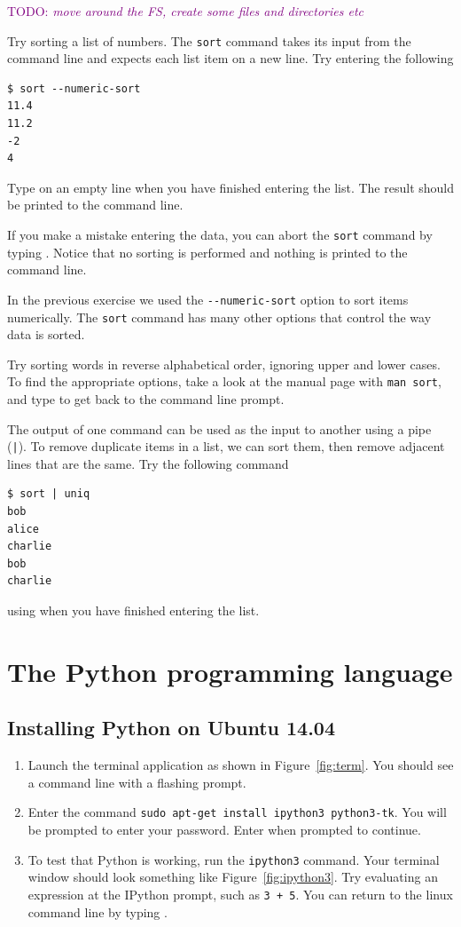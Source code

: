 \documentclass[a4paper,twoside]{memoir}
\makeatletter
\newcommand{\FrameTitle}[2]{%
  \fboxrule=\FrameRule \fboxsep=\FrameSep
  \fbox{\vbox{\nobreak \vskip -0.7\FrameSep
    \rlap{\centerline{\strut#1}}\nobreak\nointerlineskip%
    \vskip 0.7\FrameSep
    \hbox{#2}}}}
\newenvironment{framewithtitle}[2][\FrameFirst@Lab\ (cont.)]{%
  \def\FrameFirst@Lab{\textbf{#2}}%
  \def\FrameCont@Lab{\textbf{#1}}%
  \def\FrameCommand##1{%
    \FrameTitle{\FrameFirst@Lab}{##1}}%
  \def\FirstFrameCommand##1{%
    \FrameTitle{\FrameFirst@Lab}{##1}}%
  \def\MidFrameCommand##1{%
    \FrameTitle{\FrameCont@Lab}{##1}}%
  \def\LastFrameCommand##1{%
    \FrameTitle{\FrameCont@Lab}{##1}}%
\MakeFramed{\advance\hsize-\width \FrameRestore}}%
{\endMakeFramed}
\newcounter{exercisectr}
\newenvironment{exercise}
{\stepcounter{exercisectr}\begin{framewithtitle}{Practical \arabic{exercisectr}}}
{\end{framewithtitle}}
\newcommand{\shellcmd}{\texttt}
\newcommand{\additional}{\medskip\noindent{\textit{Additional exercises}}}
\newcommand{\TODO}[1]{\textcolor{purple}{TODO: \emph{#1}}}
\makeatother
\begin{document}
\begin{exercise}
\TODO{move around the FS, create some files and directories etc}

Try sorting a list of numbers.  The \shellcmd{sort} command takes its input from the command line and expects each list item on a new line.  Try entering the following
\begin{verbatim}
$ sort --numeric-sort
11.4
11.2
-2
4
\end{verbatim}
Type  on an empty line when you have finished entering the list.  The result should be printed to the command line.

If you make a mistake entering the data, you can abort the \shellcmd{sort} command by typing .  Notice that no sorting is performed and nothing is printed to the command line.

\additional

In the previous exercise we used the \shellcmd{-{}-numeric-sort} option to sort items numerically.  The \shellcmd{sort} command has many other options that control the way data is sorted.

Try sorting words in reverse alphabetical order, ignoring upper and lower cases.  To find the appropriate options, take a look at the manual page with \shellcmd{man sort}, and type  to get back to the command line prompt.

The output of one command can be used as the input to another using a pipe (\shellcmd{|}).  To remove duplicate items in a list, we can sort them, then remove adjacent lines that are the same.  Try the following command
\begin{verbatim}
$ sort | uniq
bob
alice
charlie
bob
charlie
\end{verbatim}
using  when you have finished entering the list.
\end{exercise}

\chapter{The Python programming language}

\section{Installing Python on Ubuntu 14.04}
\begin{enumerate}
\item Launch the terminal application as shown in Figure~\ref{fig:term}.  You should see a command line with a flashing prompt.
\item Enter the command \shellcmd{sudo apt-get install ipython3 python3-tk}.  You will be prompted to enter your password.  Enter  when prompted to continue.
\item To test that Python is working, run the \shellcmd{ipython3} command.  Your terminal window should look something like Figure~\ref{fig:ipython3}.  Try evaluating an expression at the IPython prompt, such as \shellcmd{3 + 5}.  You can return to the linux command line by typing .
\end{enumerate}
\end{document}
